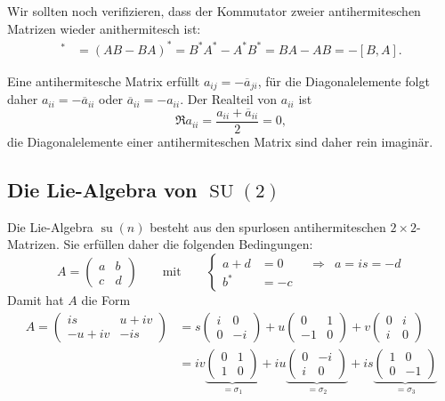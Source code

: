 Wir sollten noch verifizieren, dass der Kommutator zweier antihermiteschen
Matrizen wieder anithermitesch ist:
%
\begin{align*}
[A,B]^*
&=
(AB-BA)^*
=
B^*A^*-A^*B^*
=
BA - AB
=
-[B,A].
\end{align*}

Eine antihermitesche Matrix erfüllt $a_{i\!j}=-\overline{a}_{ji}$,
für die Diagonalelemente folgt daher $a_{ii} = -\overline{a}_{ii}$
oder $\overline{a}_{ii}=-a_{ii}$.
Der Realteil von $a_{ii}$ ist
\[
\Re a_{ii}
=
\frac{a_{ii}+\overline{a}_{ii}}2
=
0,
\]
die Diagonalelemente einer antihermiteschen Matrix sind daher rein
imaginär.


%
%
\subsection{Die Lie-Algebra von $\operatorname{SU}(2)$}
Die Lie-Algebra $\operatorname{su}(n)$ besteht aus den
spurlosen antihermiteschen $2\times 2$-Matrizen.
%
Sie erfüllen daher die folgenden Bedingungen:
\[
A=\begin{pmatrix}a&b\\c&d\end{pmatrix}
\qquad
\text{mit}
\qquad
\left\{
\begin{aligned}
a+d&=0&&\Rightarrow& a=is = -d
\\
b^*&=-c
\end{aligned}
\right.
\]
Damit hat $A$ die Form
\begin{align*}
A=\begin{pmatrix}
is&u+iv\\
-u+iv&-is
\end{pmatrix}
&=
s
\begin{pmatrix}
i&0\\
0&-i
\end{pmatrix}
+
u
\begin{pmatrix}
 0&1\\
-1&0
\end{pmatrix}
+
v
\begin{pmatrix}
0&i\\
i&0
\end{pmatrix}
\\
&=
iv\underbrace{\begin{pmatrix}0&1\\1&0\end{pmatrix}}_{\displaystyle=\sigma_1}
+
iu\underbrace{\begin{pmatrix}0&-i\\i&0\end{pmatrix}}_{\displaystyle=\sigma_2}
+
is\underbrace{\begin{pmatrix}1&0\\0&-1\end{pmatrix}}_{\displaystyle=\sigma_3}
\end{align*}
